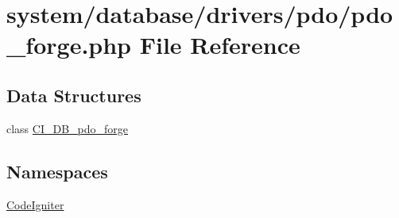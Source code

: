 \hypertarget{pdo__forge_8php}{}\section{system/database/drivers/pdo/pdo\+\_\+forge.php File Reference}
\label{pdo__forge_8php}
\subsection*{Data Structures}
\begin{DoxyCompactItemize}
\item 
class \mbox{\hyperlink{class_c_i___d_b__pdo__forge}{C\+I\+\_\+\+D\+B\+\_\+pdo\+\_\+forge}}
\end{DoxyCompactItemize}
\subsection*{Namespaces}
\begin{DoxyCompactItemize}
\item 
 \mbox{\hyperlink{namespace_code_igniter}{Code\+Igniter}}
\end{DoxyCompactItemize}
